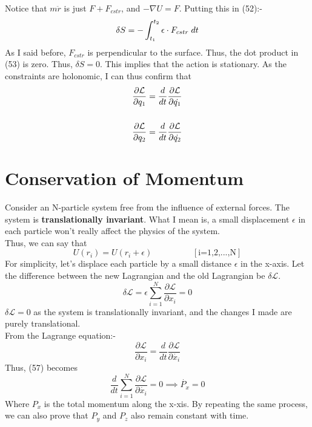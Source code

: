 \documentclass[12pt]{article}
\begin{document}
    Notice that $m\ddot{r}$ is just $F + F_{cstr}$, and $-\nabla U = F$. Putting this in (52):-
    \begin{equation}
        \delta S = -\int_{t_1}^{t_2}\epsilon \cdot F_{cstr}\hspace{0.1cm} dt
    \end{equation} 
    As I said before, $F_{cstr}$ is perpendicular to the surface. Thus, the dot product in (53) is zero.
    Thus, $\delta S = 0$. This implies that the action is stationary. As the constraints are holonomic, I can thus confirm that
    \begin{align}
        \frac{\partial \mathcal{L}}{\partial q_1}=\frac{d}{dt}\frac{\partial \mathcal{L}}{\partial \dot{q_1}} \\ \notag \\ \frac{\partial \mathcal{L}}{\partial q_2}=\frac{d}{dt}\frac{\partial \mathcal{L}}{\partial \dot{q_2}}
    \end{align}

    \section{Conservation of Momentum}
    Consider an N-particle system free from the influence of external forces. The system is \textbf{translationally invariant}.
    What I mean is, a small displacement $\epsilon$ in each particle won't really affect the physics of the system.
    \\ Thus, we can say that 
    \begin{equation}
        U(r_i)=U(r_i+\epsilon)\hspace{2cm}[\text{i=1,2,...,N}]
    \end{equation}
    For simplicity, let's displace each particle by a small distance $\epsilon$ in the x-axis.
    Let the difference between the new Lagrangian and the old Lagrangian be $\delta \mathcal{L}$.
    \begin{equation}
        \delta \mathcal{L} = \epsilon\sum_{i=1}^{N}\frac{\partial\mathcal{L}}{\partial x_i}=0
    \end{equation}
    $\delta \mathcal{L}=0$ as the system is translationally invariant, and the changes I made are purely translational.
    \\ From the Lagrange equation:-
    \begin{equation}
        \frac{\partial \mathcal{L}}{\partial x_i}=\frac{d}{dt}\frac{\partial \mathcal{L}}{\partial \dot{x_i}}
    \end{equation}
    Thus, (57) becomes
    \begin{equation}
        \frac{d}{dt}\sum_{i=1}^{N}\frac{\partial\mathcal{L}}{\partial\dot{x_i}}=0 \implies \dot{P_x}=0
    \end{equation}
    Where $P_x$ is the total momentum along the x-xis. By repeating the same process, we can also prove that $P_y$ and $P_z$ also remain constant with time.
    
\end{document}
